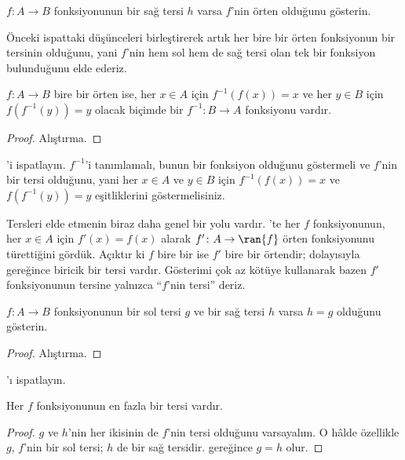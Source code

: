 \documentclass[../../../include/open-logic-section]{subfiles}
\begin{document}
\begin{prob}
$f\colon A \to B$ fonksiyonunun bir sağ tersi $h$ varsa $f$'nin örten
olduğunu gösterin.
\end{prob}

\begin{explain}
  Önceki ispattaki düşünceleri birleştirerek artık her bire bir örten
  fonksiyonun bir tersinin olduğunu, yani $f$'nin hem sol hem de sağ tersi
  olan tek bir fonksiyon bulunduğunu elde ederiz.
\end{explain}

\begin{prop}
$f\colon A \to B$ bire bir örten ise, her $x \in A$ için
$f^{-1}(f(x))=x$ ve her $y \in B$ için $f(f^{-1}(y))=y$ olacak biçimde bir
$f^{-1}\colon B \to A$ fonksiyonu vardır.
\end{prop}

\begin{proof}
Alıştırma.
\end{proof}

\begin{prob}
'i ispatlayın. $f^{-1}$'i
tanımlamalı, bunun bir fonksiyon olduğunu göstermeli ve $f$'nin bir tersi
olduğunu, yani her $x \in A$ ve $y \in B$ için $f^{-1}(f(x))=x$ ve
$f(f^{-1}(y))=y$ eşitliklerini göstermelisiniz.
\end{prob}

\begin{explain}
Tersleri elde etmenin biraz daha genel bir yolu vardır. 'te
her $f$ fonksiyonunun, her $x \in A$ için $f'(x)=f(x)$ alarak
$f' \colon A \to \ran{f}$ örten fonksiyonunu türettiğini gördük. Açıktır ki
$f$ bire bir ise $f'$ bire bir örtendir; dolayısıyla
 gereğince biricik bir tersi vardır. Gösterimi
çok az kötüye kullanarak bazen $f'$ fonksiyonunun tersine yalnızca ``$f$'nin
tersi'' deriz.
\end{explain}

\begin{prop}%
  $f\colon A \to B$ fonksiyonunun bir sol tersi $g$ ve bir sağ tersi $h$
  varsa $h=g$ olduğunu gösterin.
\end{prop}

\begin{proof}
  Alıştırma.
\end{proof}

\begin{prob}
  'ı ispatlayın.
\end{prob}

\begin{prop}
Her $f$ fonksiyonunun en fazla bir tersi vardır.
\end{prop}

\begin{proof}
  $g$ ve $h$'nin her ikisinin de $f$'nin tersi olduğunu varsayalım. O hâlde
  özellikle $g$, $f$'nin bir sol tersi; $h$ de bir sağ tersidir.
   gereğince $g=h$ olur.
\end{proof}
\end{document}
